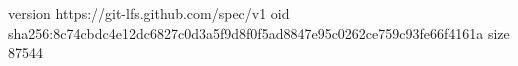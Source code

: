 version https://git-lfs.github.com/spec/v1
oid sha256:8c74cbdc4e12dc6827c0d3a5f9d8f0f5ad8847e95c0262ce759c93fe66f4161a
size 87544
